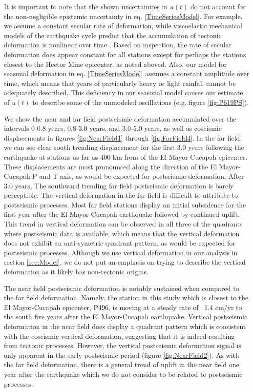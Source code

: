 \documentclass[12pt]{article}
\begin{document}
It is important to note that the shown uncertainties in $u(t)$ do not account for the non-negligible epistemic uncertainty in eq. \ref{TimeSeriesModel}.  For example, we assume a constant secular rate of deformation, while viscoelastic mechanical models of the earthquake cycle predict that the accumulation of tectonic deformation is nonlinear over time \citep{Thatcher1983}. Based on inspection, the rate of secular deformation does appear constant for all stations except for perhaps the stations closest to the Hector Mine epicenter, as noted aboved.  Also, our model for seasonal deformation in eq. \ref{TimeSeriesModel} assumes a constant amplitude over time, which means that years of particularly heavy or light rainfall cannot be adequately described.  This deficiency in our seasonal model causes our estimate of $u(t)$ to describe some of the unmodeled oscillations (e.g. figure \ref{fig:P619PS}).          

We show the near and far field postseismic deformation accumulated over the intervals  0-0.8 years, 0.8-3.0 years, and 3.0-5.0 years, as well as coseismic displacements in figures \ref{fig:NearField1} through \ref{fig:FarField4}.  In the far field, we can see clear south trending displacement for the first 3.0 years following the earthquake at stations as far as 400 km from of the El Mayor Cucapah epicenter.  These displacements are most pronounced along the direction of the El Mayor-Cucapah P and T axis, as would be expected for postseismic deformation. After 3.0 years, The southward trending far field postseismic deformation is barely perceptible.  The vertical deformation in the far field is difficult to attribute to postseismic processes.  Most far field stations display an initial subsidence for the first year after the El Mayor-Cucapah earthquake followed by continued uplift.  This trend in vertical deformation can be observed in all three of the quadrants where postseismic data is available, which means that the vertical deformation does not exhibit an anti-symetric quadrant pattern, as would be expected for postseismic processes.  Although we use vertical deformation in our analysis in section \ref{sec:Model},  we do not put an emphasis on trying to describe the vertical deformation as it likely has non-tectonic origins.        

The near field postseismic deformation is notably sustained when compared to the far field deformation.  Namely, the station in this study which is closest to the El Mayor-Cucapah epicenter, P496, is moving at a steady rate of ~1.4 cm/yr to the south five years after the El Mayor-Cucapah earthquake.  Vertical postseismic deformation in the near field does display a quadrant pattern which is consistent with the coseismic vertical deformation, suggesting that it is indeed resulting from tectonic processes.  However, the vertical postseismic deformation signal is only apparent in the early postseismic period (figure \ref{fig:NearField2}).  As with the far field deformation, there is a general trend of uplift in the near field one year after the earthquake which we do not consider to be related to postseismic processes.  
\end{document}
